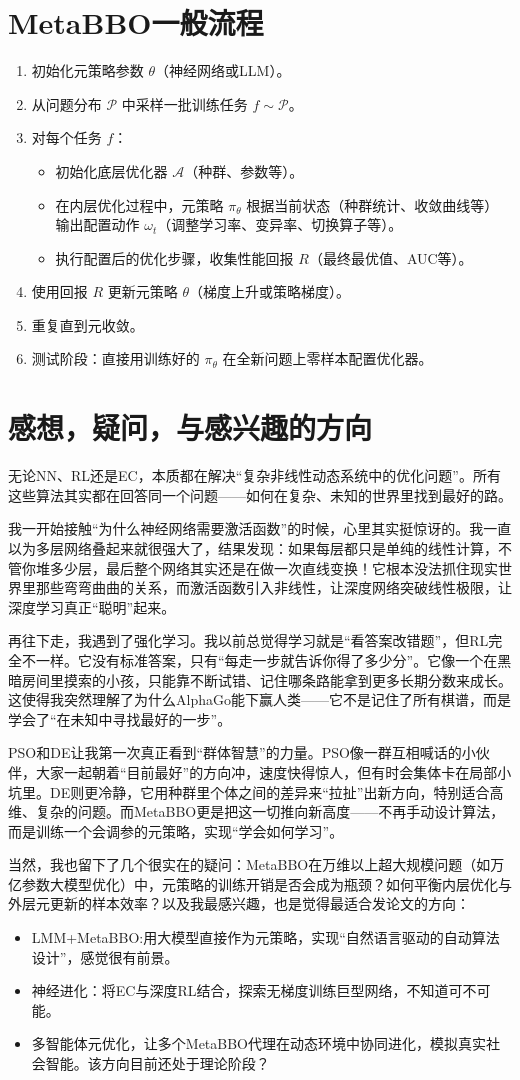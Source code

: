 \documentclass[12pt,a4paper,UTF8]{ctexart}
\begin{document}
\section{MetaBBO一般流程}
\begin{enumerate}
    \item 初始化元策略参数 \(\theta\)（神经网络或LLM）。
    \item 从问题分布 \(\mathcal{P}\) 中采样一批训练任务 \(f \sim \mathcal{P}\)。
    \item 对每个任务 \(f\)：
    \begin{itemize}
        \item 初始化底层优化器 \(\mathcal{A}\)（种群、参数等）。
        \item 在内层优化过程中，元策略 \(\pi_\theta\) 根据当前状态（种群统计、收敛曲线等）输出配置动作 \(\omega_t\)（调整学习率、变异率、切换算子等）。
        \item 执行配置后的优化步骤，收集性能回报 \(R\)（最终最优值、AUC等）。
    \end{itemize}
    \item 使用回报 \(R\) 更新元策略 \(\theta\)（梯度上升或策略梯度）。
    \item 重复直到元收敛。
    \item 测试阶段：直接用训练好的 \(\pi_\theta\) 在全新问题上零样本配置优化器。
\end{enumerate}

\section{感想，疑问，与感兴趣的方向}
无论NN、RL还是EC，本质都在解决“复杂非线性动态系统中的优化问题”。所有这些算法其实都在回答同一个问题——如何在复杂、未知的世界里找到最好的路。

我一开始接触“为什么神经网络需要激活函数”的时候，心里其实挺惊讶的。我一直以为多层网络叠起来就很强大了，结果发现：如果每层都只是单纯的线性计算，不管你堆多少层，最后整个网络其实还是在做一次直线变换！它根本没法抓住现实世界里那些弯弯曲曲的关系，而激活函数引入非线性，让深度网络突破线性极限，让深度学习真正“聪明”起来。

再往下走，我遇到了强化学习。我以前总觉得学习就是“看答案改错题”，但RL完全不一样。它没有标准答案，只有“每走一步就告诉你得了多少分”。它像一个在黑暗房间里摸索的小孩，只能靠不断试错、记住哪条路能拿到更多长期分数来成长。这使得我突然理解了为什么AlphaGo能下赢人类——它不是记住了所有棋谱，而是学会了“在未知中寻找最好的一步”。

PSO和DE让我第一次真正看到“群体智慧”的力量。PSO像一群互相喊话的小伙伴，大家一起朝着“目前最好”的方向冲，速度快得惊人，但有时会集体卡在局部小坑里。DE则更冷静，它用种群里个体之间的差异来“拉扯”出新方向，特别适合高维、复杂的问题。而MetaBBO更是把这一切推向新高度——不再手动设计算法，而是训练一个会调参的元策略，实现“学会如何学习”。

当然，我也留下了几个很实在的疑问：MetaBBO在万维以上超大规模问题（如万亿参数大模型优化）中，元策略的训练开销是否会成为瓶颈？如何平衡内层优化与外层元更新的样本效率？以及我最感兴趣，也是觉得最适合发论文的方向：
\begin{itemize}
\item LMM+MetaBBO:用大模型直接作为元策略，实现“自然语言驱动的自动算法设计”，感觉很有前景。
\item 神经进化：将EC与深度RL结合，探索无梯度训练巨型网络，不知道可不可能。
\item 多智能体元优化，让多个MetaBBO代理在动态环境中协同进化，模拟真实社会智能。该方向目前还处于理论阶段？
\end{itemize}
\end{document}
